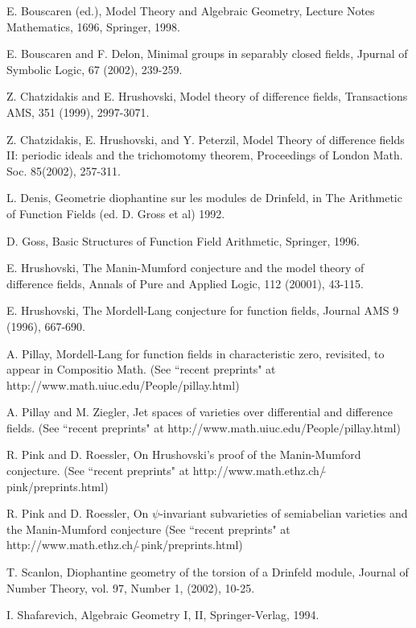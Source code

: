 \begin{thebibliography}{99}
 E. Bouscaren (ed.), Model
Theory and Algebraic Geometry, Lecture Notes
Mathematics, 1696, Springer, 1998.

 E. Bouscaren and F.
Delon, Minimal groups in separably closed
fields, Jpurnal of Symbolic Logic, 67 (2002),
239-259.

 Z. Chatzidakis
and E. Hrushovski, Model theory of difference
fields, Transactions AMS, 351 (1999),
2997-3071.

 Z. Chatzidakis, E. Hrushovski,
and Y. Peterzil, Model Theory of difference
fields II: periodic ideals and the
trichomotomy theorem, Proceedings of London
Math. Soc. 85(2002), 257-311.

 L. Denis, Geometrie
diophantine sur les modules de Drinfeld, in
The Arithmetic of Function Fields (ed. D.
Gross et al) 1992.

 D. Goss, Basic Structures of
Function Field Arithmetic, Springer, 1996.

 E. Hrushovski, The
Manin-Mumford conjecture and the model theory
of difference fields, Annals of Pure and
Applied Logic, 112 (20001), 43-115.

 E. Hrushovski, The
Mordell-Lang conjecture for function fields,
Journal AMS 9 (1996), 667-690.

 A. Pillay, Mordell-Lang for
function fields in characteristic zero,
revisited, to appear in Compositio Math. (See
``recent preprints" at
http://www.math.uiuc.edu/People/pillay.html)

 A. Pillay and M.
Ziegler, Jet spaces of varieties over
differential and difference fields. (See
``recent preprints" at
http://www.math.uiuc.edu/People/pillay.html)

 R. Pink and D.
Roessler, On Hrushovski's proof of the
Manin-Mumford conjecture. (See ``recent
preprints" at
http://www.math.ethz.ch/$\tilde{\ }$pink/preprints.html)

 R. Pink and D.
Roessler, On $\psi$-invariant subvarieties of
semiabelian varieties and the Manin-Mumford
conjecture (See ``recent preprints" at
http://www.math.ethz.ch/$\tilde{\ }$pink/preprints.html)

 T. Scanlon, Diophantine
geometry of the torsion of a Drinfeld module,
Journal of Number Theory, vol. 97, Number 1,
(2002), 10-25.

 I. Shafarevich,
Algebraic Geometry I, II, Springer-Verlag,
1994.
\end{thebibliography}


